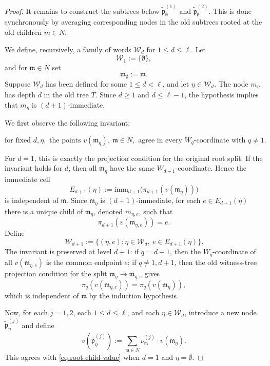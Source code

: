 \documentclass[10pt]{amsart}
\theoremstyle{plain}
\theoremstyle{definition}
\let\leq\leqslant
\let\geq\geqslant
\providecommand{\imm}[0]{\ensuremath{\mathrm{imm}}\xspace}
\newcommand{\fm}{\mathfrak{m}}
\newcommand{\fp}{\mathfrak{p}}
\begin{document}
\begin{proof}
It remains to construct the subtrees below
$\widetilde{\fp}^{(1)}_{\emptyset}$ and $\widetilde{\fp}^{(2)}_{\emptyset}$.  This is done
synchronously by averaging corresponding nodes in the old subtrees
rooted at the old children $m\in N$.

We define, recursively, a family of words $\mathcal W_d$ for
$1\leq d\leq \ell$.  Let
\[
  \mathcal W_1:=\{\emptyset\},
\]
and for $\fm\in N$ set
\[
  \fm_{\emptyset}:=\fm.
\]
Suppose $\mathcal W_d$ has been defined for some $1\leq d<\ell$, and
let $\eta\in\mathcal W_d$.  The node $m_\eta$ has depth $d$ in the
old tree $T$.  Since $d\geq 1$ and $d\leq \ell-1$, the hypothesis
implies that $m_\eta$ is $(d+1)$-immediate.

We first observe the following invariant:

\[
  \text{for fixed }d,\eta,\text{ the points }v(\fm_\eta),\ \fm\in N,
  \text{ agree in every }W_q\text{-coordinate with }q\neq 1.
\]

For $d=1$, this is exactly the projection condition for the original
root split.  If the invariant holds for $d$, then all $\fm_\eta$ have
the same $W_{d+1}$-coordinate.  Hence the immediate cell
\[
  E_{d+1}(\eta):=
  \imm_{d+1}\bigl(\pi_{d+1}(v(\fm_\eta))\bigr)
\]
is independent of $\fm$.  Since $\fm_\eta$ is $(d+1)$-immediate, for each
$e\in E_{d+1}(\eta)$ there is a unique child of $\fm_\eta$, denoted
$m_{\eta,e}$, such that
\[
  \pi_{d+1}(v(\fm_{\eta,e}))=e.
\]
Define
\[
  \mathcal W_{d+1}
  :=
  \{(\eta,e):\eta\in\mathcal W_d,\ e\in E_{d+1}(\eta)\}.
\]
The invariant is preserved at level $d+1$: if $q=d+1$, then the
$W_q$-coordinate of all $v(\fm_{\eta,e})$ is the common endpoint $e$;
if $q\neq 1,d+1$, then the old witness-tree projection condition for
the split $\fm_\eta\to \fm_{\eta,e}$ gives
\[
  \pi_q(v(\fm_{\eta,e}))=\pi_q(v(\fm_\eta)),
\]
which is independent of $\fm$ by the induction hypothesis.

Now, for each $j=1,2$, each $1\leq d\leq \ell$, and each
$\eta\in\mathcal W_d$, introduce a new node $\widetilde{\fp}^{(j)}_\eta$ and define
\begin{equation}\label{eq:z-def}
  v(\widetilde{\fp}^{(j)}_\eta)
  :=
  \sum_{\fm\in N}\nu_\fm^{(j)}\cdot v(\fm_\eta).
\end{equation}
This agrees with \eqref{eq:root-child-value} when $d=1$ and
$\eta=\emptyset$.


\end{proof}
\end{document}
